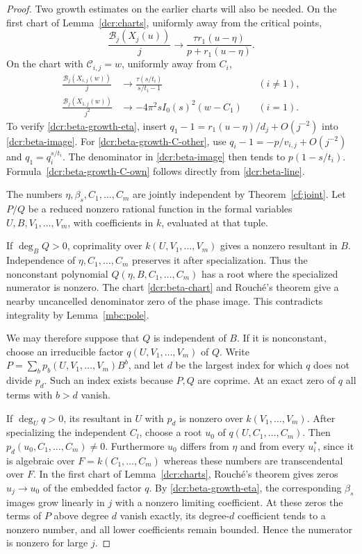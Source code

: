 \documentclass[11pt]{article}
\theoremstyle{definition}
\theoremstyle{remark}
\begin{document}
\begin{proof}
Two growth estimates on the earlier charts will also be needed.
On the first chart of Lemma~\ref{dcr:charts}, uniformly away from
the critical points,
\begin{equation}\label{dcr:beta-growth-eta}
 \frac{\mathscr B_j(X_j(u))}{j}
   \longrightarrow
   \frac{\tau r_1(u-\eta)}{p+r_1(u-\eta)}.
\end{equation}
On the chart with $\mathscr C_{i,j}=w$, uniformly away from $C_i$,
\begin{align}
 \frac{\mathscr B_j(X_{i,j}(w))}{j}
 &\longrightarrow \frac{\tau(s/t_i)}{s/t_i-1}
       &&(i\ne1),\label{dcr:beta-growth-C-other}\\
 \frac{\mathscr B_j(X_{1,j}(w))}{j^2}
 &\longrightarrow-4\pi^2sI_0(s)^2(w-C_1)
       &&(i=1).\label{dcr:beta-growth-C-own}
\end{align}
To verify \eqref{dcr:beta-growth-eta}, insert
$q_1-1=r_1(u-\eta)/d_j+O(j^{-2})$ into
\eqref{dcr:beta-image}. For \eqref{dcr:beta-growth-C-other}, use
$q_i-1=-p/v_{i,j}+O(j^{-2})$ and $q_1=q_i^{s/t_i}$.
The denominator in \eqref{dcr:beta-image} then tends to
$p(1-s/t_i)$. Formula~\eqref{dcr:beta-growth-C-own} follows directly
from \eqref{dcr:beta-line}.

The numbers $\eta,\beta_s,C_1,\ldots,C_m$ are jointly independent
by Theorem~\ref{cf:joint}. Let $P/Q$ be a reduced nonzero rational
function in the formal variables $U,B,V_1,\ldots,V_m$, with coefficients
in $k$, evaluated at that tuple.

If $\deg_B Q>0$, coprimality over $k(U,V_1,\ldots,V_m)$ gives a
nonzero resultant in $B$. Independence of $\eta,C_1,\ldots,C_m$
preserves it after specialization. Thus the nonconstant polynomial
$Q(\eta,B,C_1,\ldots,C_m)$ has a root where the specialized numerator
is nonzero. The chart \eqref{dcr:beta-chart} and Rouch\'e's theorem
give a nearby uncancelled denominator zero of the phase image.
This contradicts integrality by Lemma~\ref{mbc:pole}.

We may therefore suppose that $Q$ is independent of $B$. If it is
nonconstant, choose an irreducible factor
$q(U,V_1,\ldots,V_m)$ of $Q$. Write
$P=\sum_b p_b(U,V_1,\ldots,V_m)B^b$, and let $d$ be the largest
index for which $q$ does not divide $p_d$. Such an index exists because
$P,Q$ are coprime. At an exact zero of $q$ all terms with $b>d$ vanish.

If $\deg_U q>0$, its resultant in $U$ with $p_d$ is nonzero over
$k(V_1,\ldots,V_m)$. After specializing the independent $C_l$, choose
a root $u_0$ of $q(U,C_1,\ldots,C_m)$. Then
$p_d(u_0,C_1,\ldots,C_m)\ne0$. Furthermore $u_0$ differs from
$\eta$ and from every $u_i^*$, since it is algebraic over
$F=k(C_1,\ldots,C_m)$ whereas these numbers are transcendental over
$F$. In the first chart of Lemma~\ref{dcr:charts}, Rouch\'e's theorem
gives zeros $u_j\to u_0$ of the embedded factor $q$. By
\eqref{dcr:beta-growth-eta}, the corresponding $\beta_s$ images grow
linearly in $j$ with a nonzero limiting coefficient. At these zeros
the terms of $P$ above degree $d$ vanish exactly, its degree-$d$
coefficient tends to a nonzero number, and all lower coefficients
remain bounded. Hence the numerator is nonzero for large $j$.


\end{proof}
\end{document}
